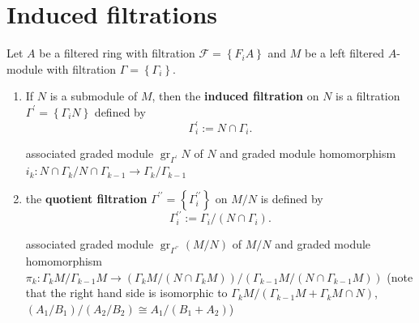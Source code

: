 \documentclass[12pt, oneside]{book}
\begin{document}
\section{Induced filtrations}
\begin{definition}
    Let $A$ be a filtered ring with filtration $\mathcal{F}=\left\{F_iA\right\}$ and $M$ be a left filtered $A$-module with filtration $\Gamma=\left\{\Gamma_i\right\}$.
    \begin{enumerate}
        \item
              If $N$ is a submodule of $M$, then the \textbf{induced filtration} on $N$ is a filtration $\Gamma^\prime=\left\{\Gamma_iN\right\}$ defined by
              \begin{equation*}
                  \Gamma_i^\prime
                  :=
                  N \cap \Gamma_i .
              \end{equation*}
              \begin{remark}
                  associated graded module $\operatorname{gr}_{\Gamma^\prime}N$ of $N$ and graded module homomorphism $i_k:N \cap \Gamma_{k}/N \cap \Gamma_{k-1}\rightarrow \Gamma_k/\Gamma_{k-1}$
              \end{remark}
        \item
              the \textbf{quotient filtration} $\Gamma^{\prime\prime}=\left\{\Gamma_i^{\prime\prime}\right\}$ on $M / N$ is defined by
              \begin{equation*}
                  \Gamma_i^{\prime\prime}
                  :=
                  \Gamma_i /(N \cap \Gamma_i) .
              \end{equation*}
              \begin{remark}
                  associated graded module $\operatorname{gr}_{\Gamma^{\prime\prime}}(M / N)$ of $M / N$ and graded module homomorphism $\pi_k:\Gamma_kM/\Gamma_{k-1}M \rightarrow \left(\Gamma_kM /(N \cap \Gamma_kM)\right) /\left(\Gamma_{k-1}M /(N \cap \Gamma_{k-1}M)\right) $ (note that the right hand side is isomorphic to $\Gamma_kM /\left(\Gamma_{k-1}M+\Gamma_kM\cap N\right)$, $\left(A_1/B_1\right)/\left(A_2/B_2\right)\cong A_1/\left(B_1+A_2\right)$)
              \end{remark}
    \end{enumerate}
\end{definition}
\end{document}
